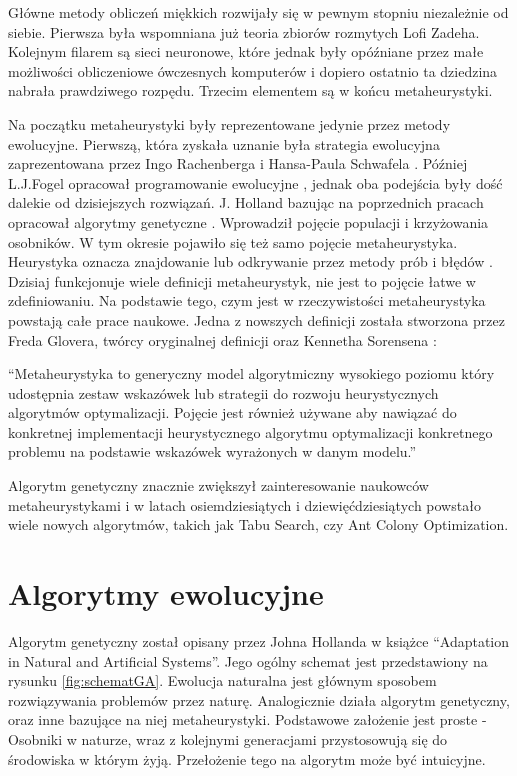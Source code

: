 \documentclass[twoside]{iisthesis}
\begin{document}
Główne metody obliczeń miękkich rozwijały się w pewnym stopniu niezależnie od siebie. Pierwsza była wspomniana już teoria zbiorów rozmytych Lofi Zadeha. Kolejnym filarem są sieci neuronowe, które jednak były opóźniane przez małe możliwości obliczeniowe ówczesnych komputerów i dopiero ostatnio ta dziedzina nabrała prawdziwego rozpędu. Trzecim elementem są w końcu metaheurystyki.

Na początku metaheurystyki były reprezentowane jedynie przez metody ewolucyjne. Pierwszą, która zyskała uznanie była strategia ewolucyjna zaprezentowana przez Ingo Rachenberga i Hansa-Paula Schwafela \cite{Rechenberg1989}. Później L.J.Fogel opracował programowanie ewolucyjne \cite{Fogel:2011}, jednak oba podejścia były dość dalekie od dzisiejszych rozwiązań. J. Holland bazując na poprzednich pracach opracował algorytmy genetyczne \cite{Yang:2011}. Wprowadził pojęcie populacji i krzyżowania osobników. W tym okresie pojawiło się też samo pojęcie metaheurystyka. Heurystyka oznacza znajdowanie lub odkrywanie przez metody prób i błędów \cite{Yang:2011}. Dzisiaj funkcjonuje wiele definicji metaheurystyk, nie jest to pojęcie łatwe w zdefiniowaniu. Na podstawie tego, czym jest w rzeczywistości metaheurystyka powstają całe prace naukowe. Jedna z nowszych definicji została stworzona przez Freda Glovera, twórcy oryginalnej definicji oraz Kennetha Sorensena \cite{history-meta}: 

``Metaheurystyka to generyczny model algorytmiczny wysokiego poziomu który udostępnia zestaw wskazówek lub strategii do rozwoju heurystycznych algorytmów optymalizacji. Pojęcie jest również używane aby nawiązać do konkretnej implementacji heurystycznego algorytmu optymalizacji konkretnego problemu na podstawie wskazówek wyrażonych w danym modelu.''

Algorytm genetyczny znacznie zwiększył zainteresowanie naukowców metaheurystykami i w latach osiemdziesiątych i dziewięćdziesiątych powstało wiele nowych algorytmów, takich jak Tabu Search, czy Ant Colony Optimization.

\section{Algorytmy ewolucyjne}

Algorytm genetyczny został opisany przez Johna Hollanda w książce ``Adaptation in Natural and Artificial Systems''. Jego ogólny schemat jest przedstawiony na rysunku \ref{fig:schematGA}. Ewolucja naturalna jest głównym sposobem rozwiązywania problemów przez naturę. Analogicznie działa algorytm genetyczny, oraz inne bazujące na niej metaheurystyki. Podstawowe założenie jest proste - Osobniki w naturze, wraz z kolejnymi generacjami przystosowują się do środowiska w którym żyją. Przełożenie tego na algorytm może być intuicyjne.
\end{document}
